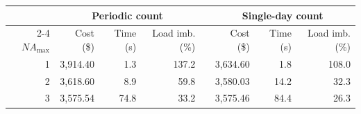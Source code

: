 \begin{tabular}{@{}r@{\quad}rrr@{}p{1em}@{}rrr@{}}
  \hline
   & \multicolumn{3}{c}{Periodic count} &  & \multicolumn{3}{c}{Single-day count} \\
  \cline{2-4} \cline{6-8}
  $NA_{\max}$ & Cost (\$) & Time (s) & Load imb. (\%) &  & Cost (\$) & Time (s) & Load imb. (\%) \\
  \hline
  1 & 3{,}914.40 & 1.3 & 137.2 &  & 3{,}634.60 & 1.8 & 108.0 \\
  2 & 3{,}618.60 & 8.9 & 59.8 &  & 3{,}580.03 & 14.2 & 32.3 \\
  3 & 3{,}575.54 & 74.8 & 33.2 &  & 3{,}575.46 & 84.4 & 26.3 \\
  \hline
\end{tabular}
